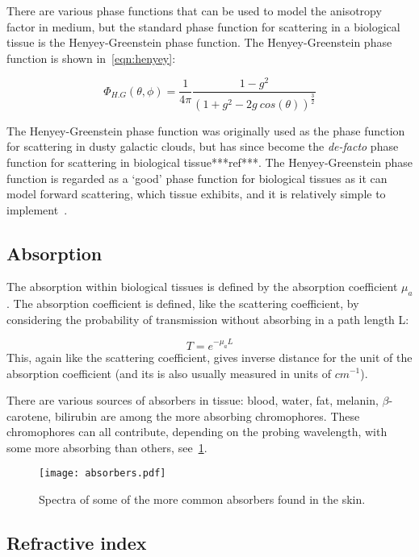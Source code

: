 There are various phase functions that can be used to model the anisotropy factor in medium, but the standard phase function for scattering in a biological tissue is the Henyey-Greenstein phase function. The Henyey-Greenstein phase function is shown in~\cref{eqn:henyey}:

\begin{equation}
	\Phi_{H.G}(\theta,\phi)=\frac{1}{4\pi}\frac{1-g^2}{(1+g^2-2g\ cos(\theta))^{\tfrac{3}{2}}}
	\label{eqn:henyey}
\end{equation}

The Henyey-Greenstein phase function was originally used as the phase function for scattering in dusty galactic clouds, but has since become the \textit{de-facto} phase function for scattering in biological tissue***ref***. The Henyey-Greenstein phase function is regarded as a `good' phase function for biological tissues as it can model forward scattering, which tissue exhibits, and it is relatively simple to implement~\cite{jacques1987angular}.

\subsection{Absorption}\label{sec:absor}

The absorption within biological tissues is defined by the absorption coefficient $\mu_a$. The absorption coefficient is defined, like the scattering coefficient, by considering the probability of transmission without absorbing in a path length L:

\begin{equation}
	T=e^{-\mu_aL}
\end{equation}
This, again like the scattering coefficient, gives inverse distance for the unit of the absorption coefficient (and its is also usually measured in units of $cm^{-1}$).

There are various sources of absorbers in tissue: blood, water, fat, melanin, $\beta$-carotene, bilirubin are among the more absorbing chromophores. These chromophores can all contribute, depending on the probing wavelength, with some more absorbing than others, see~\cref{fig:absorb}. 

\begin{figure}
	\centering
	\texttt{[image: absorbers.pdf]}
	\caption{Spectra of some of the more common absorbers found in the skin.}
	\label{fig:absorb}
\end{figure}

\subsection{Refractive index}\label{sec:refrac}

